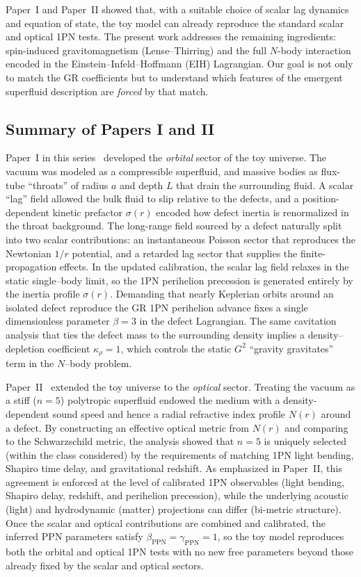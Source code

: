 \documentclass[11pt]{article}
\begin{document}
\medskip
Paper~I and Paper~II showed that, with a suitable choice of scalar lag dynamics
and equation of state, the toy model can already reproduce the standard scalar
and optical 1PN tests.
The present work addresses the remaining ingredients: spin-induced
gravitomagnetism (Lense--Thirring) and the full $N$-body interaction encoded in
the Einstein--Infeld--Hoffmann (EIH) Lagrangian.
Our goal is not only to match the GR coefficients but to understand which
features of the emergent superfluid description are \emph{forced} by that
match.

\subsection{Summary of Papers I and II}
\label{subsec:intro-summary-papers12}

Paper~I in this series~\cite{Norris:2025Orbits} developed the \emph{orbital} sector
of the toy universe.
The vacuum was modeled as a compressible superfluid, and massive bodies as
flux-tube ``throats'' of radius $a$ and depth $L$ that drain the surrounding
fluid.
A scalar ``lag'' field allowed the bulk fluid to slip relative to the defects,
and a position-dependent kinetic prefactor $\sigma(r)$ encoded how defect
inertia is renormalized in the throat background.
The long-range field sourced by a defect naturally split into two scalar
contributions: an instantaneous Poisson sector that reproduces the Newtonian
$1/r$ potential, and a retarded lag sector that supplies the finite-propagation
effects.
In the updated calibration, the scalar lag field relaxes in the static
single–body limit, so the 1PN perihelion precession is generated entirely by
the inertia profile $\sigma(r)$.
Demanding that nearly Keplerian orbits around an isolated defect reproduce the
GR 1PN perihelion advance fixes a single dimensionless parameter $\beta=3$ in
the defect Lagrangian.
The same cavitation analysis that ties the defect mass to the surrounding
density implies a density–depletion coefficient $\kappa_\rho = 1$, which
controls the static $G^2$ ``gravity gravitates'' term in the $N$–body problem.

Paper~II~\cite{Norris:Paper2} extended the toy universe to the \emph{optical}
sector.
Treating the vacuum as a stiff ($n=5$) polytropic superfluid endowed the medium
with a density-dependent sound speed and hence a radial refractive index
profile $N(r)$ around a defect.
By constructing an effective optical metric from $N(r)$ and comparing to the
Schwarzschild metric, the analysis showed that $n=5$ is uniquely selected
(within the class considered) by the requirements of matching 1PN light
bending, Shapiro time delay, and gravitational redshift.
As emphasized in Paper~II, this agreement is enforced at the level of
calibrated 1PN observables (light bending, Shapiro delay, redshift, and
perihelion precession), while the underlying acoustic (light) and
hydrodynamic (matter) projections can differ (bi-metric structure).
Once the scalar and optical contributions are combined and calibrated, the
inferred PPN parameters satisfy $\beta_{\mathrm{PPN}}=\gamma_{\mathrm{PPN}}=1$,
so the toy model reproduces both the orbital and optical 1PN tests with no new
free parameters beyond those already fixed by the scalar and optical sectors.
\end{document}
